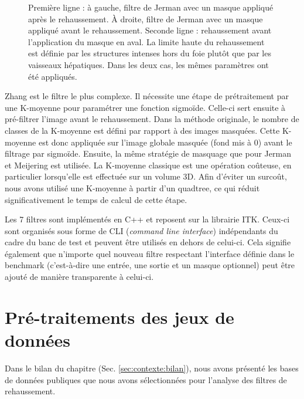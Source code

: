 \begin{figure}[!ht]
  \centering
  \caption{Première ligne : à gauche, filtre de Jerman avec un masque appliqué après le rehaussement. À droite, filtre de Jerman avec un masque appliqué avant le rehaussement. Seconde ligne : rehaussement avant l'application du masque en aval. La limite haute du rehaussement est définie par les structures intenses hors du foie plutôt que par les vaisseaux hépatiques. Dans les deux cas, les mêmes paramètres ont été appliqués.}
  \label{fig:smart_mask_effect}
\end{figure}

Zhang est le filtre le plus complexe. Il nécessite une étape de prétraitement par une K-moyenne pour paramétrer une fonction sigmoïde. Celle-ci sert ensuite à pré-filtrer l'image avant le rehaussement. Dans la méthode originale, le nombre de classes de la K-moyenne est défini par rapport à des images masquées. Cette K-moyenne est donc appliquée sur l'image globale masquée (fond mis à 0) avant le filtrage par sigmoïde. Ensuite, la même stratégie de masquage que pour Jerman et Meijering est utilisée. La K-moyenne classique est une opération coûteuse, en particulier lorsqu'elle est effectuée sur un volume 3D. Afin d'éviter un surcoût, nous avons utilisé une K-moyenne à partir d'un quadtree, ce qui réduit significativement le temps de calcul de cette étape.

Les 7 filtres sont implémentés en C++ et reposent sur la librairie ITK. Ceux-ci sont organisés sous forme de CLI (\textit{command line interface}) indépendants du cadre du banc de test et peuvent être utilisés en dehors de celui-ci. Cela signifie également que n'importe quel nouveau filtre respectant l'interface définie dans le benchmark (c'est-à-dire une entrée, une sortie et un masque optionnel) peut être ajouté de manière transparente à celui-ci.

\section{Pré-traitements des jeux de données}
\label{sec:Benchmark:traitement_des_données}

Dans le bilan du chapitre \chapContextN{} (Sec. \ref{sec:contexte:bilan}), nous avons présenté les bases de données publiques que nous avons sélectionnées pour l'analyse des filtres de rehaussement.

